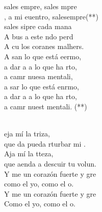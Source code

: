 \documentclass[12pt]{article}
\begin{document}
\newpage
{}
\begin{multicols*}{2}
\begin{cancion}%
	 sales empre, sales mpre\\
	, a mi euentro, salesempre(**)\\
	sales sipre cada mana\\
	A bus a este ndo perd\\
	A cu los coranes malhers.\\
	A san lo que está eermo,\\
	a dar a a lo que ha rto,\\
	a camr nuesa mentali,\\
	a sar lo que está enrmo,\\
	a dar a a lo que ha rto,\\
	a camr nuest mentali. (**)\\
\end{cancion}%

\begin{cancion}%
	     \\
	eja  mí la triza,\\
	que da pueda rturbar mi .\\
	Aja  mí la tteza,\\
	que aenda a descuir tu volun.\\
	Y me un corazón fuerte y gre\\
	como el yo, como el o.\\
	Y me un corazón fuerte y gre\\
	Como el yo, como el o.\\
\end{cancion}%


\end{multicols*}
\end{document}
